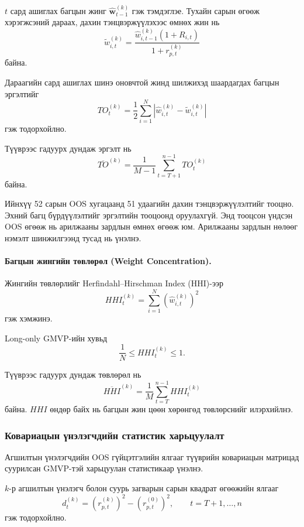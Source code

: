 $t$ сард ашиглах багцын жинг
$\widehat{\boldsymbol{w}}_{t-1}^{(k)}$
гэж тэмдэглэе. Тухайн сарын өгөөж
хэрэгжсэний дараах, дахин
тэнцвэржүүлэхээс өмнөх жин нь
\[
\widetilde{w}_{i,t}^{(k)}
=
\frac{
	\widehat{w}_{i,t-1}^{(k)}(1+R_{i,t})
}{
	1+r_{p,t}^{(k)}
}
\]
байна.

Дараагийн сард ашиглах шинэ
оновчтой жинд шилжихэд шаардагдах
багцын эргэлтийг
\[
TO_t^{(k)}
=
\frac{1}{2}
\sum_{i=1}^{N}
\left|
\widehat{w}_{i,t}^{(k)}
-
\widetilde{w}_{i,t}^{(k)}
\right|
\]
гэж тодорхойлно.

Түүврээс гадуурх дундаж эргэлт нь
\[
\overline{TO}^{(k)}
=
\frac{1}{M-1}
\sum_{t=T+1}^{n-1}TO_t^{(k)}
\]
байна.

Ийнхүү 52 сарын OOS хугацаанд
51 удаагийн дахин тэнцвэржүүлэлтийг
тооцно. Эхний багц бүрдүүлэлтийг
эргэлтийн тооцоонд оруулахгүй.
Энд тооцсон үндсэн OOS өгөөж нь арилжааны
зардлын өмнөх өгөөж юм. Арилжааны зардлын
нөлөөг нэмэлт шинжилгээнд тусад нь үнэлнэ.


\paragraph{Багцын жингийн төвлөрөл
	(Weight Concentration).}

Жингийн төвлөрлийг
Herfindahl--Hirschman Index (HHI)-ээр
\[
HHI_t^{(k)}
=
\sum_{i=1}^{N}
\left(\widehat{w}_{i,t}^{(k)}\right)^2
\]
гэж хэмжинэ.

Long-only GMVP-ийн хувьд
\[
\frac{1}{N}
\leq
HHI_t^{(k)}
\leq 1.
\]

Түүврээс гадуурх дундаж төвлөрөл нь
\[
\overline{HHI}^{(k)}
=
\frac{1}{M}
\sum_{t=T}^{n-1}HHI_t^{(k)}
\]
байна. $HHI$ өндөр байх нь багцын
жин цөөн хөрөнгөд төвлөрснийг
илэрхийлнэ.


\subsubsection{Ковариацын үнэлэгчдийн
	статистик харьцуулалт}
\label{subsubsec:statistical_comparison}

Агшилтын үнэлэгчдийн OOS гүйцэтгэлийн
ялгааг түүврийн ковариацын матрицад
суурилсан GMVP-тэй харьцуулан
статистикаар үнэлнэ.

$k$-р агшилтын үнэлэгч болон суурь
загварын сарын квадрат өгөөжийн
ялгааг
\[
d_t^{(k)}
=
\left(r_{p,t}^{(k)}\right)^2
-
\left(r_{p,t}^{(0)}\right)^2,
\qquad t=T+1,\ldots,n
\]
гэж тодорхойлно.

